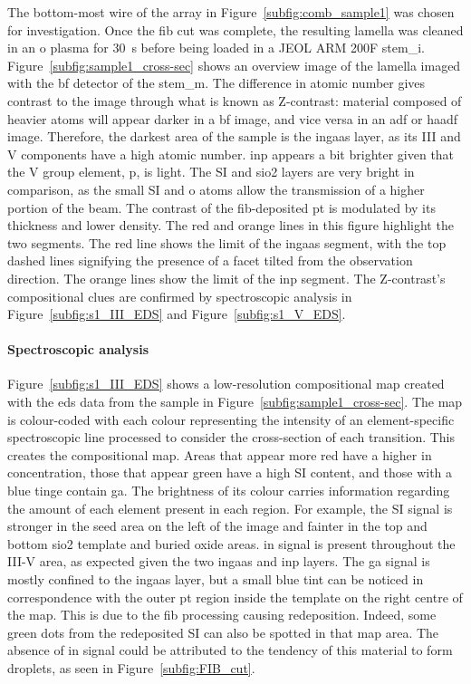 The bottom-most wire of the array in Figure~\ref{subfig:comb_sample1} was chosen for investigation. Once the \acs{fib} cut was complete, the resulting lamella was cleaned in an \acl{o} plasma for \qty{30}{s} before being loaded in a JEOL ARM 200F \acl{stem_i}. Figure~\ref{subfig:sample1_cross-sec} shows an overview image of the lamella imaged with the \acf{bf} detector of the \acs{stem_m}. The difference in atomic number gives contrast to the image through what is known as Z-contrast: material composed of heavier atoms will appear darker in a \acs{bf} image, and vice versa in an \acf{adf} or \acf{haadf} image. Therefore, the darkest area of the sample is the \acs{ingaas} layer, as its III and V components have a high atomic number. \acs{inp} appears a bit brighter given that the V group element, \acl{p}, is light. The \acl{SI} and \acs{sio2} layers are very bright in comparison, as the small \acl{SI} and \acl{o} atoms allow the transmission of a higher portion of the beam. The contrast of the \acs{fib}-deposited \acl{pt} is modulated by its thickness and lower density. The red and orange lines in this figure highlight the two segments. The red line shows the limit of the \acs{ingaas} segment, with the top dashed lines signifying the presence of a facet tilted from the observation direction. The orange lines show the limit of the \acs{inp} segment. The Z-contrast's compositional clues are confirmed by spectroscopic analysis in Figure~\ref{subfig:s1_III_EDS} and Figure~\ref{subfig:s1_V_EDS}. 

\paragraph{Spectroscopic analysis}Figure~\ref{subfig:s1_III_EDS} shows a low-resolution compositional map created with the \acf{eds} data from the sample in Figure~\ref{subfig:sample1_cross-sec}. The map is colour-coded with each colour representing the intensity of an element-specific spectroscopic line processed to consider the cross-section of each transition. This creates the compositional map. Areas that appear more red have a higher \acl{in} concentration, those that appear green have a high \acl{SI} content, and those with a blue tinge contain \acl{ga}. The brightness of its colour carries information regarding the amount of each element present in each region. For example, the \acl{SI} signal is stronger in the seed area on the left of the image and fainter in the top and bottom \acs{sio2} template and buried oxide areas. \Acl{in} signal is present throughout the III-V area, as expected given the two \acs{ingaas} and \acs{inp} layers. The \acl{ga} signal is mostly confined to the \acs{ingaas} layer, but a small blue tint can be noticed in correspondence with the outer \acl{pt} region inside the template on the right centre of the map. This is due to the \acs{fib} processing causing redeposition. Indeed, some green dots from the redeposited \acl{SI} can also be spotted in that map area. The absence of \acl{in} signal could be attributed to the tendency of this material to form droplets, as seen in Figure~\ref{subfig:FIB_cut}.

